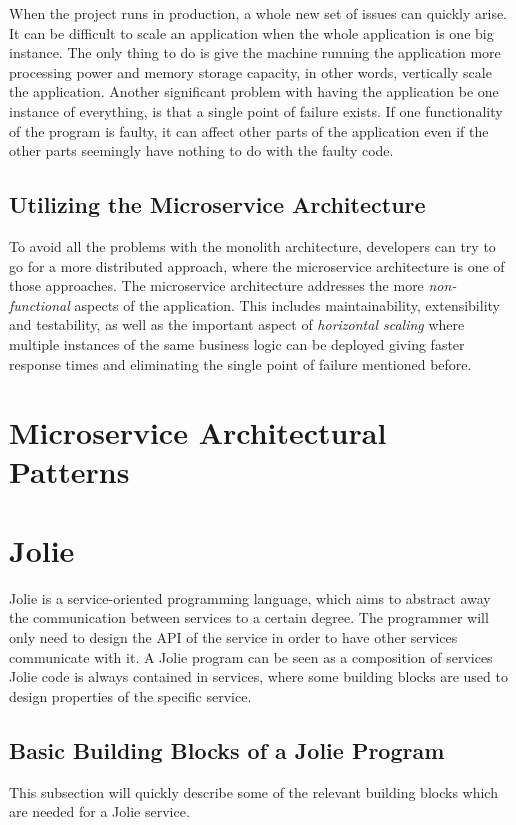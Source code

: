 When the project runs in production, a whole new set of issues can quickly arise. It can be difficult
to scale an application when the whole application is one big instance.
The only thing to do is give the machine running the application more processing power and memory 
storage capacity, in other words, vertically scale the application. Another significant problem with having the application be one instance of everything, is that a single point of failure exists. If one functionality of the program is faulty, it can affect other parts of the application
even if the other parts seemingly have nothing to do with the faulty code.

\subsection{Utilizing the Microservice Architecture}
To avoid all the problems with the monolith architecture, developers can try to go for a more
 distributed approach, where the microservice architecture is one of those approaches.
The microservice architecture addresses the more \textit{non-functional} aspects of the application.
This includes maintainability, extensibility and testability, as well as the important aspect of 
\textit{horizontal scaling} where multiple instances of the same business logic can be deployed giving 
faster response times and eliminating the single point of failure mentioned before.

\section{Microservice Architectural Patterns}

\section{Jolie}
Jolie is a service-oriented programming language, which aims to abstract away the communication between services to a certain degree.
The programmer will only need to design the API of the service in order to have other services communicate with it.
A Jolie program can be seen as a composition of services
Jolie code is always contained in services, where some building blocks are used to design properties of the specific service.

\subsection{Basic Building Blocks of a Jolie Program}
This subsection will quickly describe some of the relevant building blocks which are needed for a Jolie service.

